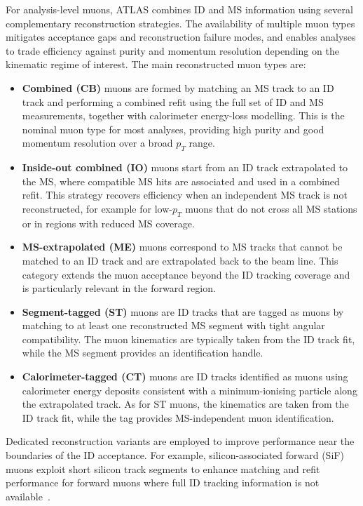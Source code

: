 For analysis-level muons, ATLAS combines ID and MS information using several
complementary reconstruction strategies.
The availability of multiple muon types mitigates acceptance gaps and
reconstruction failure modes, and enables analyses to trade efficiency against
purity and momentum resolution depending on the kinematic regime of interest.
The main reconstructed muon types are:

\begin{itemize}
  \item \textbf{Combined (CB)} muons are formed by matching an MS track to an ID
  track and performing a combined refit using the full set of ID and MS
  measurements, together with calorimeter energy-loss modelling.
  This is the nominal muon type for most analyses, providing high purity and good
  momentum resolution over a broad $p_T$ range.

  \item \textbf{Inside-out combined (IO)} muons start from an ID track extrapolated
  to the MS, where compatible MS hits are associated and used in a combined
  refit.
  This strategy recovers efficiency when an independent MS track is not
  reconstructed, for example for low-$p_T$ muons that do not cross all MS stations
  or in regions with reduced MS coverage.

  \item \textbf{MS-extrapolated (ME)} muons correspond to MS tracks that cannot be
  matched to an ID track and are extrapolated back to the beam line.
  This category extends the muon acceptance beyond the ID tracking coverage and
  is particularly relevant in the forward region.

  \item \textbf{Segment-tagged (ST)} muons are ID tracks that are tagged as muons
  by matching to at least one reconstructed MS segment with tight angular
  compatibility.
  The muon kinematics are typically taken from the ID track fit, while the MS
  segment provides an identification handle.

  \item \textbf{Calorimeter-tagged (CT)} muons are ID tracks identified as muons
  using calorimeter energy deposits consistent with a minimum-ionising particle
  along the extrapolated track.
  As for ST muons, the kinematics are taken from the ID track fit, while the tag
  provides MS-independent muon identification.
\end{itemize}

Dedicated reconstruction variants are employed to improve performance near the
boundaries of the ID acceptance.
For example, silicon-associated forward (SiF) muons exploit short silicon track
segments to enhance matching and refit performance for forward muons where full
ID tracking information is not available~\cite{ATLASMuonReco2021}.

